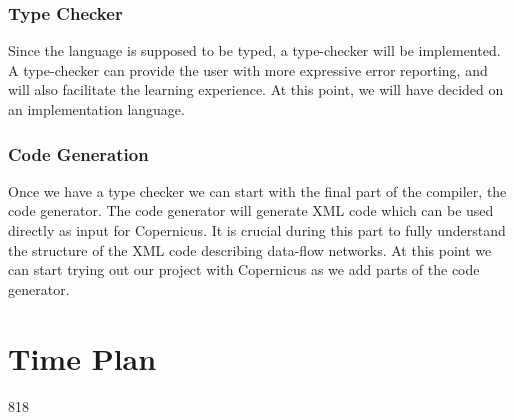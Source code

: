 \documentclass[a4paper]{article}
\begin{document}
\subsubsection{Type Checker}
Since the language is supposed to be typed, a type-checker will be
implemented. A type-checker can provide the user with more expressive
error reporting, and will also facilitate the learning experience. At
this point, we will have decided on an implementation language.

\subsubsection{Code Generation}
Once we have a type checker we can start with the final part of the
compiler, the code generator. The code generator will generate XML
code which can be used directly as input for Copernicus. It is crucial
during this part to fully understand the structure of the XML code
describing data-flow networks. At this point we can start trying out
our project with Copernicus as we add parts of the code generator.


\section{Time Plan}
\begin{gantt}[
    xunitlength=0.5cm,
    fontsize=\small,
    titlefontsize=\small,
    drawledgerline=true]
  {8}{18}
  \begin{ganttitle}
  \end{ganttitle}
  \begin{ganttitle}
  \end{ganttitle}
\end{gantt}
\end{document}
